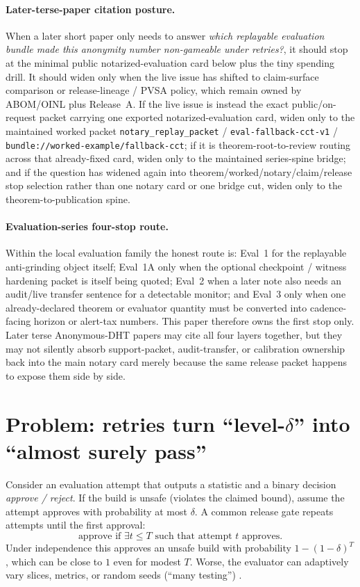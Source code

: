 \documentclass[11pt]{article}
\begin{document}
\paragraph{Later-terse-paper citation posture.}
When a later short paper only needs to answer \emph{which replayable evaluation bundle made this anonymity number non-gameable under retries?}, it should stop at the minimal public notarized-evaluation card below plus the tiny spending drill.
It should widen only when the live issue has shifted to claim-surface comparison or release-lineage / PVSA policy, which remain owned by ABOM/OINL plus Release~A. If the live issue is instead the exact public/on-request packet carrying one exported notarized-evaluation card, widen only to the maintained worked packet \nolinkurl{notary\_replay\_packet} / \nolinkurl{eval-fallback-cct-v1} / \nolinkurl{bundle://worked-example/fallback-cct}; if it is theorem-root-to-review routing across that already-fixed card, widen only to the maintained series-spine bridge; and if the question has widened again into theorem/worked/notary/claim/release stop selection rather than one notary card or one bridge cut, widen only to the theorem-to-publication spine.\cite{series:abomoinl,series:releaseproperty,series:workedexample,series:seriesspines,series:theoremtopublicationspine}

\paragraph{Evaluation-series four-stop route.}
Within the local evaluation family the honest route is: Eval~1 for the replayable anti-grinding object itself; Eval~1A only when the optional checkpoint / witness hardening packet is itself being quoted; Eval~2 when a later note also needs an audit/live transfer sentence for a detectable monitor; and Eval~3 only when one already-declared theorem or evaluator quantity must be converted into cadence-facing horizon or alert-tax numbers.
This paper therefore owns the first stop only.
Later terse Anonymous-DHT papers may cite all four layers together, but they may not silently absorb support-packet, audit-transfer, or calibration ownership back into the main notary card merely because the same release packet happens to expose them side by side.

\section{Problem: retries turn \texorpdfstring{``level-$\delta$''}{``level-delta''} into ``almost surely pass''}
Consider an evaluation attempt that outputs a statistic and a binary decision \emph{approve / reject}.
If the build is unsafe (violates the claimed bound), assume the attempt approves with probability at most $\delta$.
A common release gate repeats attempts until the first approval:
\[
\text{approve if } \exists t \le T \text{ such that attempt $t$ approves.}
\]
Under independence this approves an unsafe build with probability $1-(1-\delta)^T$, which can be close to $1$ even for modest $T$.
Worse, the evaluator can adaptively vary slices, metrics, or random seeds (``many testing'') \cite{series:manytestinglowerbounds}.
\end{document}
